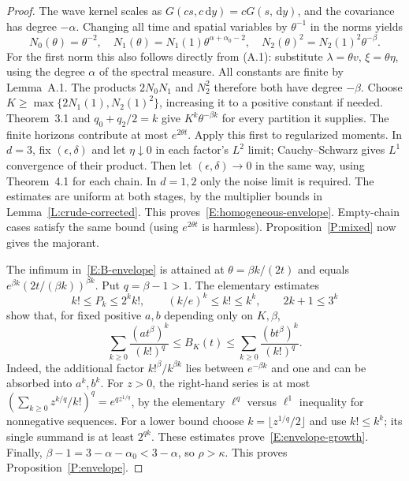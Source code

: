 \documentclass[12pt]{article}
\numberwithin{equation}{section}
\theoremstyle{definition}
\newcommand{\ud}{\,\mathrm{d}}
\begin{document}
\begin{proof}
  The wave kernel scales as
  $G(cs,c\ud y)=cG(s,\ud y)$, and the covariance has degree $-\alpha$.
  Changing all time and spatial variables by $\theta^{-1}$ in the norms
  yields
  \begin{equation}\label{E:homogeneous-norms}
    N_0(\theta)=\theta^{-2},\quad
    N_1(\theta)=N_1(1)\theta^{\alpha+\alpha_0-2},\quad
    N_2(\theta)^2=N_2(1)^2\theta^{-\beta}.
  \end{equation}
  For the first norm this also follows directly from (A.1): substitute
  $\lambda=\theta v$, $\xi=\theta\eta$, using the degree $\alpha$ of
  the spectral measure. All constants are finite by Lemma~A.1.
  The products $2N_0N_1$ and $N_2^2$ therefore both have degree
  $-\beta$. Choose
  $K\ge\max\{2N_1(1),N_2(1)^2\}$, increasing it to a positive
  constant if needed. Theorem~3.1 and $q_0+q_2/2=k$ give
  $K^k\theta^{-\beta k}$ for every partition it supplies. The finite
  horizons contribute at most $e^{2\theta t}$. Apply this first to
  regularized moments. In $d=3$, fix $(\epsilon,\delta)$ and let
  $\eta\downarrow0$ in each factor's $L^2$ limit; Cauchy--Schwarz gives
  $L^1$ convergence of their product. Then let
  $(\epsilon,\delta)\to0$ in the same way, using Theorem~4.1 for each
  chain. In $d=1,2$ only the noise limit is required. The estimates are
  uniform at both stages, by the multiplier bounds in
  Lemma~\ref{L:crude-corrected}. This proves~\eqref{E:homogeneous-envelope}.
  Empty-chain cases satisfy the same bound (using $e^{2\theta t}$ is
  harmless). Proposition~\ref{P:mixed} now gives the majorant.

  The infimum in~\eqref{E:B-envelope} is attained at
  $\theta=\beta k/(2t)$ and equals
  $e^{\beta k}(2t/(\beta k))^{\beta k}$. Put $q=\beta-1>1$.
  The elementary estimates
  \[
    k!\le P_k\le2^k k!,\qquad
    (k/e)^k\le k!\le k^k,\qquad 2k+1\le3^k
  \]
  show that, for fixed positive $a,b$ depending only on $K,\beta$,
  \[
    \sum_{k\ge0}\frac{(at^\beta)^k}{(k!)^q}
    \le B_K(t)\le
    \sum_{k\ge0}\frac{(bt^\beta)^k}{(k!)^q}.
  \]
  Indeed, the additional factor $k!^\beta/k^{\beta k}$ lies between
  $e^{-\beta k}$ and one and can be absorbed into $a^k,b^k$.
  For $z>0$, the right-hand series is at most
  $(\sum_{k\ge0}z^{k/q}/k!)^q=e^{qz^{1/q}}$, by the elementary
  $\ell^q$ versus $\ell^1$ inequality for nonnegative sequences.
  For a lower bound choose $k=\lfloor z^{1/q}/2\rfloor$ and use
  $k!\le k^k$; its single summand is at least $2^{qk}$.
  These estimates prove~\eqref{E:envelope-growth}. Finally,
  $\beta-1=3-\alpha-\alpha_0<3-\alpha$, so $\rho>\kappa$.
  This proves Proposition~\ref{P:envelope}.
\end{proof}
\end{document}
